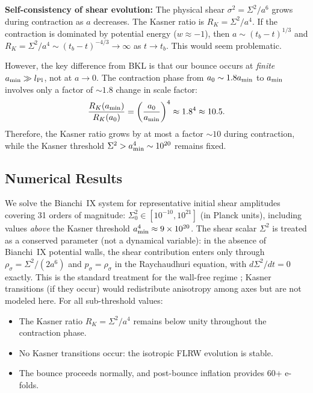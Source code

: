 \documentclass[11pt,a4paper]{article}
\begin{document}
\begin{theorem_box}
\textbf{Self-consistency of shear evolution:} The physical shear $\sigma^2 = \Sigma^2/a^6$ grows during contraction as $a$ decreases. The Kasner ratio is $R_K = \Sigma^2/a^4$. If the contraction is dominated by potential energy ($w \approx -1$), then $a \sim (t_b - t)^{1/3}$ and $R_K = \Sigma^2/a^4 \sim (t_b - t)^{-4/3} \to \infty$ as $t \to t_b$. This would seem problematic.

However, the key difference from BKL is that our bounce occurs at \emph{finite} $a_{\rm min} \gg l_{\rm Pl}$, not at $a \to 0$. The contraction phase from $a_0 \sim 1.8 a_{\rm min}$ to $a_{\rm min}$ involves only a factor of $\sim 1.8$ change in scale factor:
\begin{equation}
\frac{R_K(a_{\rm min})}{R_K(a_0)} = \left(\frac{a_0}{a_{\rm min}}\right)^4 \approx 1.8^4 \approx 10.5.
\end{equation}
Therefore, the Kasner ratio grows by at most a factor $\sim 10$ during contraction, while the Kasner threshold $\Sigma^2 > a_{\rm min}^4 \sim 10^{20}$ remains fixed.
\end{theorem_box}

\subsection{Numerical Results}

We solve the Bianchi~IX system for representative initial shear amplitudes covering 31 orders of magnitude: $\Sigma^2_0 \in [10^{-10}, 10^{21}]$ (in Planck units), including values \emph{above} the Kasner threshold $a_{\rm min}^4 \approx 9 \times 10^{20}$. The shear scalar $\Sigma^2$ is treated as a conserved parameter (not a dynamical variable): in the absence of Bianchi~IX potential walls, the shear contribution enters only through $\rho_\sigma = \Sigma^2/(2a^6)$ and $p_\sigma = \rho_\sigma$ in the Raychaudhuri equation, with $d\Sigma^2/dt = 0$ exactly. This is the standard treatment for the wall-free regime \cite{Erickson2004}; Kasner transitions (if they occur) would redistribute anisotropy among axes but are not modeled here. For all sub-threshold values:

\begin{itemize}
\item The Kasner ratio $R_K = \Sigma^2/a^4$ remains below unity throughout the contraction phase.
\item No Kasner transitions occur: the isotropic FLRW evolution is stable.
\item The bounce proceeds normally, and post-bounce inflation provides 60+ e-folds.
\end{itemize}
\end{document}
